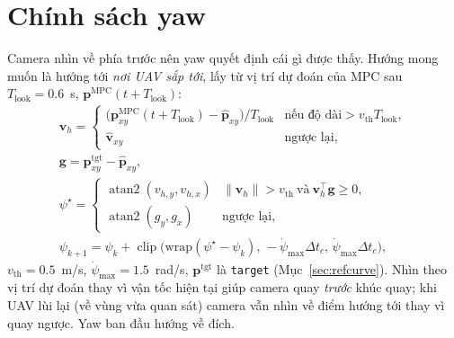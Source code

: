 \documentclass[11pt,a4paper]{article}
\numberwithin{equation}{section}
\newcommand{\vb}[1]{\bm{#1}}
\newcommand{\T}{^{\!\top}}
\newcommand{\code}[1]{\texttt{\small #1}}
\newcommand{\clip}{\operatorname{clip}}
\theoremstyle{definition}
\theoremstyle{plain}
\theoremstyle{remark}
\begin{document}
\section{Chính sách yaw}
\label{sec:yaw}
Camera nhìn về phía trước nên yaw quyết định cái gì được thấy. Hướng mong muốn là hướng tới \emph{nơi UAV sắp tới}, lấy từ vị trí dự đoán của MPC sau $T_{\text{look}}=0.6$~s, $\vb p^{\text{MPC}}(t+T_{\text{look}})$:
\begin{gather}
\vb v_h=\begin{cases}\big(\vb p^{\text{MPC}}_{xy}(t+T_{\text{look}})-\hat{\vb p}_{xy}\big)/T_{\text{look}} & \text{nếu độ dài} > v_{\text{th}}T_{\text{look}},\\ \hat{\vb v}_{xy} & \text{ngược lại,}\end{cases}\nonumber\\ \vb g=\vb p^{\text{tgt}}_{xy}-\hat{\vb p}_{xy}, \label{eq:yawdir}\\
\psi^\star=\begin{cases}\operatorname{atan2}(v_{h,y},v_{h,x}) & \|\vb v_h\|>v_{\text{th}}\ \text{và}\ \vb v_h\T\vb g\ge0,\\ \operatorname{atan2}(g_y,g_x) & \text{ngược lại,}\end{cases}\nonumber\\
\psi_{k+1}=\psi_k+\clip\big(\mathrm{wrap}(\psi^\star-\psi_k),\,-\dot\psi_{\max}\Delta t_c,\,\dot\psi_{\max}\Delta t_c\big), \label{eq:yaw}
\end{gather}
$v_{\text{th}}=0.5$~m/s, $\dot\psi_{\max}=1.5$~rad/s, $\vb p^{\text{tgt}}$ là \code{target} (Mục~\ref{sec:refcurve}). Nhìn theo vị trí dự đoán thay vì vận tốc hiện tại giúp camera quay \emph{trước} khúc quay; khi UAV lùi lại (về vùng vừa quan sát) camera vẫn nhìn về điểm hướng tới thay vì quay ngược. Yaw ban đầu hướng về đích.

\end{document}
